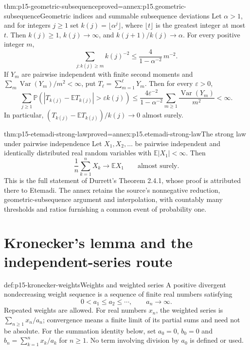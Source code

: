 \begin{hblemma}{thm:p15-geometric-subsequence}{proved=annex:p15.geometric-subsequence}{Geometric indices and summable subsequence deviations}
Let \(\alpha>1\), and for integers \(j\geq1\) set
\(k(j)=\lfloor\alpha^j\rfloor\), where \(\lfloor t\rfloor\)
is the greatest integer at most \(t\). Then \(k(j)\geq1\),
\(k(j)\to\infty\), and \(k(j+1)/k(j)\to\alpha\).
For every positive integer \(m\),
\[
 \sum_{j:k(j)\geq m}k(j)^{-2}
                     \leq\frac{4}{1-\alpha^{-2}}\,m^{-2}.
\]
If \(Y_m\) are pairwise independent with finite second moments and
\(\sum_m\operatorname{Var}(Y_m)/m^2<\infty\), put
\(T_\ell=\sum_{m=1}^\ell Y_m\). Then for every
\(\varepsilon>0\),
\[
 \sum_{j\geq1}
 \mathbb P\!\left(|T_{k(j)}-\mathbb ET_{k(j)}|>
                                       \varepsilon k(j)\right)
 \leq\frac{4\varepsilon^{-2}}{1-\alpha^{-2}}
           \sum_{m\geq1}\frac{\operatorname{Var}(Y_m)}{m^2}<\infty.
\]
In particular,
\((T_{k(j)}-\mathbb ET_{k(j)})/k(j)\to0\) almost surely.
\end{hblemma}

\begin{hbtheorem}{thm:p15-etemadi-strong-law}{proved=annex:p15.etemadi-strong-law}{The strong law under pairwise independence}
Let \(X_1,X_2,\ldots\) be pairwise independent and identically
distributed real random variables with \(\mathbb E|X_1|<\infty\).
Then
\[
 \frac1n\sum_{k=1}^nX_k\longrightarrow\mathbb EX_1
                                      \qquad\text{almost surely}.
\]
This is the full statement of Durrett's Theorem 2.4.1, whose proof is
attributed there to Etemadi. The annex retains the source's nonnegative
reduction, geometric-subsequence argument and interpolation, with
countably many thresholds and ratios furnishing a common event of
probability one.
\end{hbtheorem}

\section{Kronecker's lemma and the independent-series route}
\label{sec:p15-kronecker-strong-law}

\begin{hbdefinition}{def:p15-kronecker-weights}{Weights and weighted series}
A positive divergent nondecreasing weight sequence is a sequence of
finite real numbers satisfying
\[
 0<a_1\leq a_2\leq\cdots,\qquad a_n\longrightarrow\infty.
\]
Repeated weights are allowed. For real numbers \(x_n\), the weighted
series is \(\sum_{n\geq1}x_n/a_n\); convergence means a finite
limit of its partial sums and need not be absolute. For the summation
identity below, set \(a_0=0\), \(b_0=0\) and
\(b_n=\sum_{k=1}^nx_k/a_k\) for \(n\geq1\). No term involving
division by \(a_0\) is defined or used.
\end{hbdefinition}

